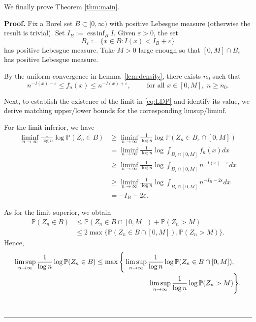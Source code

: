 \documentclass[12pt]{article}%
\newenvironment{proof}[1][Proof]{\textbf{#1.} }{\ \rule{0.5em}{0.5em}}
\newcommand{\PP}{\mathbb{P}}
\DeclareMathOperator*{\essinf}{ess\,inf}
\begin{document}
We finally prove Theorem \ref{thm:main}.

\begin{proof}
Fix a Borel set $B\subset[0,\infty)$ with positive Lebesgue measure (otherwise the result is trivial). Set $I_B:=\essinf_B I$. 
Given $\varepsilon>0$, the set 
\[
B_\varepsilon:=\{x\in B\colon I(x)<I_B+\varepsilon\}
\]
has positive Lebesgue measure. Take $M>0$ large enough so that $[0,M]\cap B_\varepsilon$ has positive Lebesgue measure. 

By the uniform convergence in Lemma~\ref{lem:density}, there exists $n_0$ such that
\begin{equation}\label{eq:uniformLem}
n^{-I(x)-\varepsilon}\le f_n(x)\le n^{-I(x)+\varepsilon},
\qquad \mbox{ for all }x\in[0,M],\; n\ge n_0 .
\end{equation}

Next, to establish the existence of the limit in \eqref{eq:LDP} and identify its value, we derive matching upper/lower bounds for the corresponding limsup/liminf.

For the limit inferior, we have
\begin{align*}
\liminf_{n\to\infty}\frac{1}{\log n}\log\PP(Z_n\in B)&\ge \liminf_{n\to\infty}\frac{1}{\log n}\log\PP(Z_n\in B_\varepsilon\cap[0,M])\\
&= \liminf_{n\to\infty}\frac{1}{\log n}\log\int_{B_\varepsilon\cap[0,M]} f_n(x) dx\\
&\ge \liminf_{n\to\infty}\frac{1}{\log n}\log\int_{B_\varepsilon\cap[0,M]} n^{-I(x)-\varepsilon} dx\\
\\
&\ge \liminf_{n\to\infty}\frac{1}{\log n}\log\int_{B_\varepsilon\cap[0,M]} n^{-I_B-2\varepsilon} dx\\
&=-I_{B}-2\varepsilon.
\end{align*}

As for the limit superior, we obtain
\begin{align*}
\mathbb{P}(Z_n\in B)
&\le\mathbb{P}(Z_n\in B\cap[0,M])+\mathbb{P}(Z_n>M)\\
&\le
2\max\Big\{
\mathbb{P}(Z_n\in B\cap[0,M]),
\mathbb{P}(Z_n>M)
\Big\}.
\end{align*}
Hence,
\begin{align*}
\limsup_{n\to\infty}\frac{1}{\log n}\log \PP(Z_n\in B)
&\le
\max\Bigg\{
\limsup_{n\to\infty}\frac{1}{\log n}
\log \PP(Z_n\in B\cap[0,M]), \\[-1mm]
&\hspace{2.7cm}
\limsup_{n\to\infty}\frac{1}{\log n}
\log \PP(Z_n>M)
\Bigg\}.
\end{align*}


\end{proof}
\end{document}
